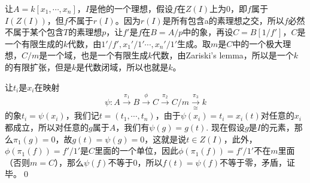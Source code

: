 \proof 让$A=k[x_1,\cdots ,x_n]$，$I$是他的一个理想，假设$f$在$Z(I)$上为0，即$f$属于$I(Z(I))$，但$f$不属于$r(I)$。因为$r(I)$是所有包含a的素理想之交，所以$f$必然不属于某个包含$T$的素理想$p$，让$f'$是$f$在$B=A/p$中的象，再设$C=B[1/f']$，$C$是一个有限生成的$k$代数，由${1'/f',x_1'/1'\cdots ,x_n'/1'}$生成。取$m$是$C$中的一个极大理想，$C/m$是一个域，也是一个有限生成$k$代数，由Zariski's lemma，所以是一个$k$的有限扩张，但是$k$是代数闭域，所以也就是$k$。

让$t_i$是$x_i$在映射
\[
	\psi:A\xrightarrow{\pi_1}B\xrightarrow{\phi}C\xrightarrow{\pi_2}C/m\xrightarrow[\cong]{\pi_3} k
\]
的象$t_i=\psi(x_i)$，我们记$t=(t_1,\cdots ,t_n)$，由于$\psi(x_i)=t_i=x_i(t)$对任意的$x_i$都成立，所以对任意的$g$属于$A$，我们有$\psi(g)=g(t)$.
现在假设$g$是$I$的元素，那么$\pi_1(g)=0$，故$g(t)=\psi(g)=0$，这就是说$t\in Z(I)$，此外，$\phi(\pi_1(f))=f'/1'$是$C$里面的一个单位，因此$\phi(\pi_1(f))=f'/1'$不在$m$里面（否则$m=C$），那么$\psi(f)$不等于$0$，所以$f(t)=\psi(f)$不等于零，矛盾，证毕。\qed
